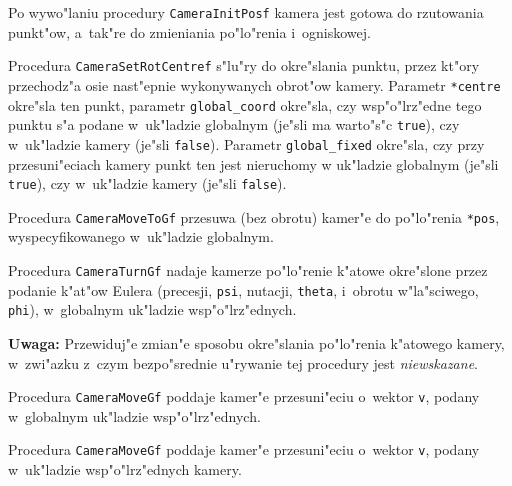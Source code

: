 Po wywo"laniu procedury \texttt{CameraInitPosf} kamera jest gotowa do
rzutowania punkt"ow, a~tak"re do zmieniania po"lo"renia i~ogniskowej.

\vspace{\bigskipamount}
Procedura \texttt{CameraSetRotCentref} s"lu"ry do okre"slania punktu, przez
kt"ory przechodz"a osie nast"epnie wykonywanych obrot"ow kamery. Parametr
\texttt{*centre} okre"sla ten punkt, parametr \texttt{global\_coord}
okre"sla, czy wsp"o"lrz"edne tego punktu s"a podane w~uk"ladzie globalnym
(je"sli ma warto"s"c \texttt{true}), czy w~uk"ladzie kamery (je"sli
\texttt{false}). Parametr \texttt{global\_fixed} okre"sla, czy przy
przesuni"eciach kamery punkt ten jest nieruchomy w uk"ladzie globalnym
(je"sli \texttt{true}), czy w~uk"ladzie kamery (je"sli \texttt{false}).

\vspace{\bigskipamount}
Procedura \texttt{CameraMoveToGf} przesuwa (bez obrotu) kamer"e do
po"lo"renia \texttt{*pos}, wyspecyfikowanego w~uk"ladzie globalnym.

\vspace{\bigskipamount}
Procedura \texttt{CameraTurnGf} nadaje kamerze po"lo"renie k"atowe
okre"slone przez podanie k"at"ow Eulera (precesji,
\texttt{psi}, nutacji, \texttt{theta}, i~obrotu w"la"sciwego, \texttt{phi}),
w~globalnym uk"ladzie wsp"o"lrz"ednych.

\vspace{\medskipamount}
\begin{sloppypar}\noindent
\textbf{Uwaga:} Przewiduj"e zmian"e sposobu okre"slania po"lo"renia
k"atowego kamery, w~zwi"azku z~czym bezpo"srednie u"rywanie tej procedury
jest \emph{niewskazane}.
\end{sloppypar}

\vspace{\bigskipamount}
Procedura \texttt{CameraMoveGf} poddaje kamer"e przesuni"eciu o~wektor
\texttt{v}, podany w~globalnym uk"ladzie wsp"o"lrz"ednych.

\vspace{\bigskipamount}
Procedura \texttt{CameraMoveGf} poddaje kamer"e przesuni"eciu o~wektor
\texttt{v}, podany w~uk"ladzie wsp"o"lrz"ednych kamery.

